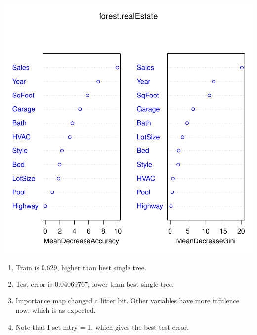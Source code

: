 \documentclass[a4paper]{article}
\begin{document}
\includegraphics{tree-3}
{\color{red}
\begin{enumerate}
\item Train is 0.629, higher than best single tree.
\item Test error is 0.04069767, lower than best single tree.
\item Importance map changed a litter bit. Other variables have more infulence now, which is as expected.
\item Note that I set mtry = 1, which gives the best test error.
\end{enumerate}
}
\end{document}

